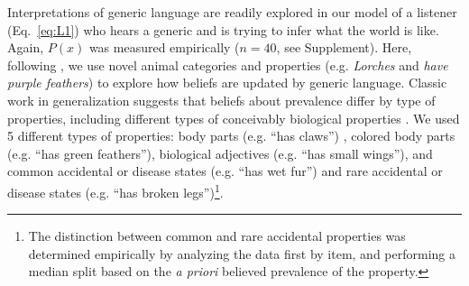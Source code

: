 \documentclass[10pt,letterpaper]{article}
\begin{document}
Interpretations of generic language are readily explored in our model of a listener (Eq.~\ref{eq:L1}) who hears a generic and is trying to infer what the world is like. 
Again, $P(x)$ was measured empirically ($n=40$, see Supplement).
Here, following , we use novel animal categories and properties (e.g. \emph{Lorches} and \emph{have purple feathers}) to explore how beliefs are updated by generic language. 
Classic work in generalization suggests that beliefs about prevalence differ by type of properties, including different types of conceivably biological properties \cite{Nisbett1983}. 
We used 5 different types of properties: body parts (e.g. ``has claws'') , colored body parts (e.g. ``has green feathers''), biological adjectives (e.g. ``has small wings''), and common accidental or disease states (e.g. ``has wet fur'') and rare accidental or disease states (e.g. ``has broken legs'')\footnote{The distinction between common and rare accidental properties was determined empirically by analyzing the data first by item, and performing a median split based on the \emph{a priori} believed prevalence of the property.}.
\end{document}
